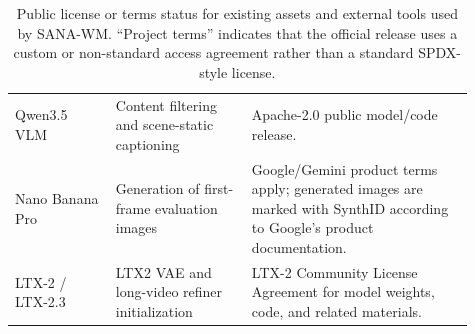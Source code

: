 \documentclass{llmxive}
\providecommand{\modelname}{SANA-WM\xspace}
\begin{document}
\begin{table}[t]
\begin{tabular}{@{}p{0.20\linewidth}p{0.27\linewidth}p{0.44\linewidth}@{}}
    Qwen3.5 VLM~\citep{qwen3_5} & Content filtering and scene-static captioning & Apache-2.0 public model/code release. \\
    Nano Banana Pro~\citep{google2025nanobananapro} & Generation of first-frame evaluation images & Google/Gemini product terms apply; generated images are marked with SynthID according to Google's product documentation. \\
    LTX-2 / LTX-2.3~\citep{ltx2} & LTX2 VAE and long-video refiner initialization & LTX-2 Community License Agreement for model weights, code, and related materials. \\
    \bottomrule
  \end{tabular}
\caption{Public license or terms status for existing assets and external tools used by \modelname. ``Project terms'' indicates that the official release uses a custom or non-standard access agreement rather than a standard SPDX-style license.}
\label{tab:asset_terms}
\end{table}





{
  \small
  
  
}
\end{document}
